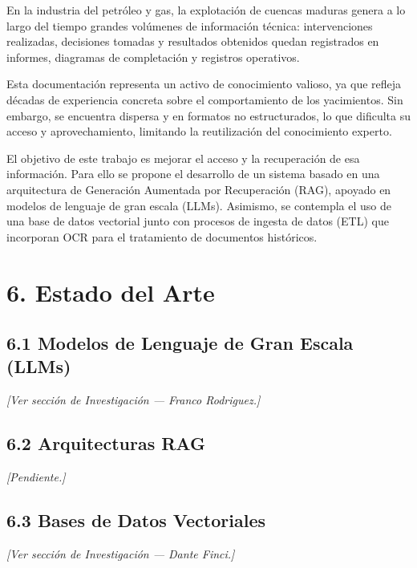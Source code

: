 \documentclass[12pt, a4paper]{report}
\begin{document}
En la industria del petróleo y gas, la explotación de cuencas maduras genera a lo largo del
tiempo grandes volúmenes de información técnica: intervenciones realizadas, decisiones tomadas
y resultados obtenidos quedan registrados en informes, diagramas de completación y registros
operativos.

Esta documentación representa un activo de conocimiento valioso, ya que refleja décadas de
experiencia concreta sobre el comportamiento de los yacimientos. Sin embargo, se encuentra
dispersa y en formatos no estructurados, lo que dificulta su acceso y aprovechamiento,
limitando la reutilización del conocimiento experto.

El objetivo de este trabajo es mejorar el acceso y la recuperación de esa información. Para ello
se propone el desarrollo de un sistema basado en una arquitectura de Generación Aumentada
por Recuperación (RAG), apoyado en modelos de lenguaje de gran escala (LLMs). Asimismo,
se contempla el uso de una base de datos vectorial junto con procesos de ingesta de datos (ETL)
que incorporan OCR para el tratamiento de documentos históricos.

\chapter*{6. Estado del Arte}

\section*{6.1 Modelos de Lenguaje de Gran Escala (LLMs)}

\textit{[Ver sección de Investigación --- Franco Rodriguez.]}

\section*{6.2 Arquitecturas RAG}

\textit{[Pendiente.]}

\section*{6.3 Bases de Datos Vectoriales}

\textit{[Ver sección de Investigación --- Dante Finci.]}
\end{document}
